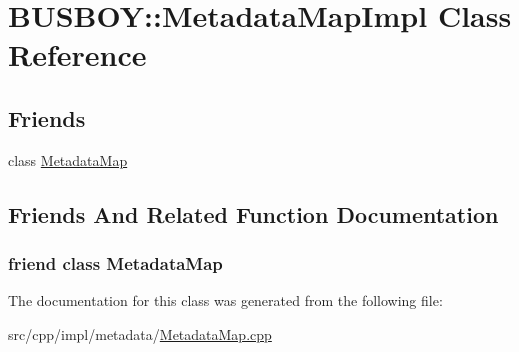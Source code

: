 \hypertarget{classBUSBOY_1_1MetadataMapImpl}{
\section{BUSBOY::MetadataMapImpl Class Reference}
\label{classBUSBOY_1_1MetadataMapImpl}
}
\subsection*{Friends}
\begin{DoxyCompactItemize}
\item 
class \hyperlink{classBUSBOY_1_1MetadataMapImpl_ab48103b3cbac48946e572320394f81ab}{MetadataMap}
\end{DoxyCompactItemize}


\subsection{Friends And Related Function Documentation}
\hypertarget{classBUSBOY_1_1MetadataMapImpl_ab48103b3cbac48946e572320394f81ab}{
\subsubsection[{MetadataMap}]{\setlength{\rightskip}{0pt plus 5cm}friend class {\bf MetadataMap}}}
\label{classBUSBOY_1_1MetadataMapImpl_ab48103b3cbac48946e572320394f81ab}


The documentation for this class was generated from the following file:\begin{DoxyCompactItemize}
\item 
src/cpp/impl/metadata/\hyperlink{MetadataMap_8cpp}{MetadataMap.cpp}\end{DoxyCompactItemize}
